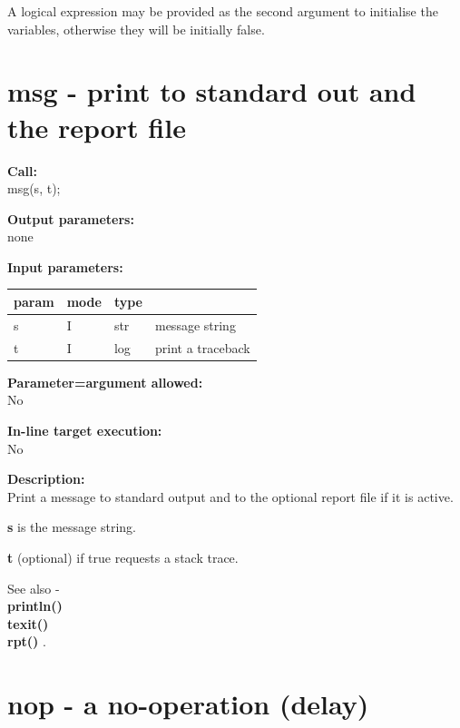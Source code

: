         A logical expression may be provided as the second
        argument to initialise the variables, otherwise they will be
        initially false.


    \section{msg - print to standard out and the report file}\label{sec:ipmsg}
        
        {\bf Call:} \\
        msg(s, t);
        
        {\bf Output parameters:} \\
        none
        
        {\bf Input parameters:} \\
        \begin{tabular}{| l | l | l | l |}
        \hline
        param & mode & type & \\
        \hline \hline
        s & I & str & message string    \\ \hline
        t & I & log & print a traceback \\ \hline
        \end{tabular}
        
        {\bf Parameter=argument allowed:} \\
        No
        
        {\bf In-line target execution:} \\
        No
        
        {\bf Description:} \\
        Print a message to standard output and to the optional report file if
        it is active.
        
        {\bf s} is the message string.
        
        {\bf t} (optional) if true requests a stack trace.
        
        See also - \\
        {\bf println()}  \\
        {\bf texit()}  \\
        {\bf rpt()} .


    \section{nop - a no-operation (delay)}\label{sec:ipnop}
        
